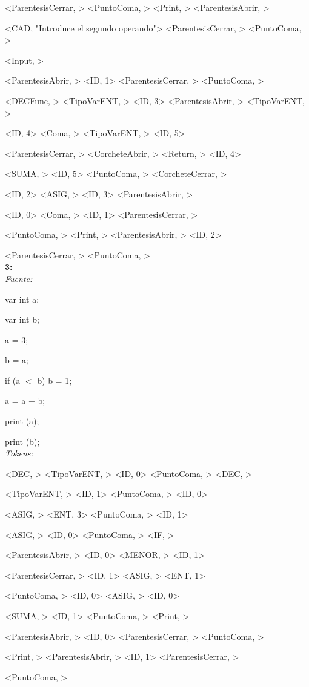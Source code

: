 \documentclass{article}
\begin{document}
 \< \> 
 <ParentesisCerrar, > 
 <PuntoComa, > 
 <Print, > 
 <ParentesisAbrir, > 
 
 \< \> 
 <CAD, \textnormal{"Introduce el segundo operando"}> 
 <ParentesisCerrar, > 
 <PuntoComa, >
 
 \< \> 
 <Input, > 
 
 \< \> 
 <ParentesisAbrir, > 
 <ID, 1> 
 <ParentesisCerrar, > 
 <PuntoComa, > 
 
 \< \> 
 <DECFunc, > 
 <TipoVarENT, > 
 <ID, 3> 
 <ParentesisAbrir, > 
 <TipoVarENT, >
 
 \< \> 
 <ID, 4> 
 <Coma, > 
 <TipoVarENT, > 
 <ID, 5> 
 
 \< \> 
 <ParentesisCerrar, > 
 <CorcheteAbrir, > 
 <Return, > 
 <ID, 4> 
 
 \< \> 
 <SUMA, > 
 <ID, 5> 
 <PuntoComa, > 
 <CorcheteCerrar, > 
 
 \< \> 
 <ID, 2> 
 <ASIG, > 
 <ID, 3> 
 <ParentesisAbrir, > 
 
 \< \> 
 <ID, 0> 
 <Coma, > 
 <ID, 1> 
 <ParentesisCerrar, > 
 
 \< \> 
 <PuntoComa, > 
 <Print, > 
 <ParentesisAbrir, > 
 <ID, 2>
 
 \< \> 
 <ParentesisCerrar, > 
 <PuntoComa, > \bigskip\\
 \textbf{3:}\medskip \\
 \emph{Fuente:}
 
var int a;

var int b;

a = 3;

b = a;

 if (a  $<$  b) b  =  1;
 
 a = a  +  b;
 
print (a);

print (b);\medskip\\
\emph{Tokens:}

\< \> 
 <DEC, > 
 <TipoVarENT, > 
 <ID, 0> 
 <PuntoComa, > 
 <DEC, > 
 
 \< \> 
 <TipoVarENT, > 
 <ID, 1> 
 <PuntoComa, > 
 <ID, 0> 
 
 \< \> 
 <ASIG, > 
 <ENT, 3> 
 <PuntoComa, > 
 <ID, 1> 
 
 \< \> 
 <ASIG, > 
 <ID, 0> 
 <PuntoComa, > 
 <IF, > 
 
 \< \> 
 <ParentesisAbrir, > 
 <ID, 0> 
 <MENOR, > 
 <ID, 1>
 
 \< \> 
 <ParentesisCerrar, > 
 <ID, 1> 
 <ASIG, > 
 <ENT, 1> 
 
 \< \> 
 <PuntoComa, > 
 <ID, 0> 
 <ASIG, > 
 <ID, 0> 
 
 \< \> 
 <SUMA, > 
 <ID, 1> 
 <PuntoComa, > 
 <Print, > 
 
 \< \> 
 <ParentesisAbrir, > 
 <ID, 0> 
 <ParentesisCerrar, > 
 <PuntoComa, > 
 
 \< \> 
 <Print, > 
 <ParentesisAbrir, > 
 <ID, 1> 
 <ParentesisCerrar, > 
 
 \< \> 
 <PuntoComa, > 
\end{document}
